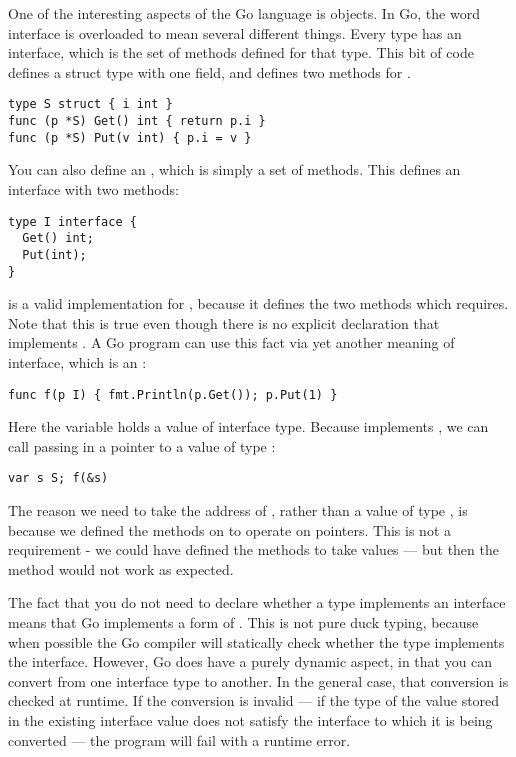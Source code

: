 One of the interesting aspects of the Go language is  objects.
In Go, the word interface is overloaded to mean several different
things. Every type has an interface, which is the set of methods defined for
that type. This bit of code defines a struct type  with one field, and
defines two methods for .
\begin{lstlisting}
type S struct { i int }
func (p *S) Get() int { return p.i }
func (p *S) Put(v int) { p.i = v }
\end{lstlisting}
You can also define an , which is simply a set of methods.
This defines an interface  with two methods:
\begin{lstlisting}
type I interface {
  Get() int;
  Put(int);
}
\end{lstlisting}
 is a valid implementation for , because it defines the two 
methods which  requires. Note that this is true even though there is 
no explicit declaration that  implements . A Go program can use 
this fact via yet another meaning of interface, which is an :

\begin{lstlisting}
func f(p I) { fmt.Println(p.Get()); p.Put(1) }
\end{lstlisting}
Here the variable  holds a value of interface type. Because
implements , we can call  passing in a pointer to a value of type
:

\begin{lstlisting}
var s S; f(&s)
\end{lstlisting}
The reason we need to take the address of , rather than a value of type
, is because we defined the methods on  to operate on pointers. This
is not a requirement - we could have defined the methods to take
values — but then the  method would not work as expected.

The fact that you do not need to declare whether a type implements an
interface means that Go implements a form of . This is not
pure duck typing, because when possible the Go compiler will statically
check whether the type implements the interface. However, Go does have a
purely dynamic aspect, in that you can convert from one interface type
to another. In the general case, that conversion is checked at runtime.
If the conversion is invalid — if the type of the value stored in the
existing interface value does not satisfy the interface to which it is
being converted — the program will fail with a runtime error.

